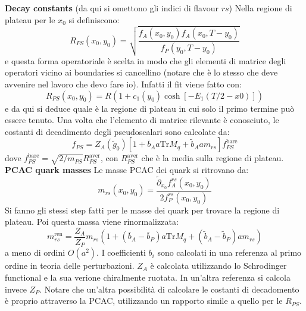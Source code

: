 \documentclass[12pt,a4paper,openright]{article}
\newcommand{\colg}{\textcolor{PineGreen}}
\newcommand{\colr}{\textcolor{BrickRed}}
\newcommand{\bare}{^{\text{bare}}}
\newcommand{\ren}{{\text{ren}}}
\begin{document}
{\bf Decay constants} \newline
(da qui si omettono gli indici di flavour $rs$) Nella regione di plateau per le $x_0$ si definiscono:
\begin{equation*}
  R_{PS}(x_0,y_0) = \sqrt{ \frac{f_A (x_0,y_0)f_A (x_0,T-y_0)}{f_P(y_0,T-y_0)} }
\end{equation*}
e questa forma operatoriale è scelta in modo che \colg{gli elementi di matrice degli operatori vicino ai boundaries si cancellino} (\colr{notare che è lo stesso che deve avvenire nel lavoro che devo fare io}).
Infatti il fit viene fatto con:
\begin{equation*}
  R_{PS}(x_0,y_0) = R(1 + c_1(y_0)\cosh[-E_1(T/2 - x0)])
\end{equation*}
e da qui si deduce quale è la regione di plateau in cui solo il primo termine può essere tenuto.
Una volta che l'elemento di matrice rilevante è conosciuto, le costanti di decadimento degli pseudoscalari sono calcolate da:
\begin{equation*}
  f_{PS} = Z_A (\tilde g_0)\left[1+ \bar b_A a\text{Tr}M_q + \tilde b_A am_{rs} \right]f_{PS}\bare
\end{equation*}
dove $f_{PS}\bare = \sqrt{2/m_{PS}} R_{PS}^{\text{aver}}$, con $R_{PS}^{\text{aver}}$ che è la media sulla regione di plateau.
\newline
\newline
{\bf PCAC quark masses} \newline
Le masse PCAC dei quark si ritrovano da:
\begin{equation*}
  m_{rs}(x_0,y_0) = \frac{\tilde{\partial}_{x_0}f_A^{rs} (x_0,y_0)}{2 f^{rs}_P (x_0,y_0)}
\end{equation*}
Si fanno gli stessi step fatti per le masse dei quark per trovare la regione di plateau.
Poi questa massa viene rinormalizzata:
\begin{equation*}
  m_{rs}^\ren = \frac{Z_A}{Z_P}m_{rs}\left(1 + ( \bar b_A - \bar b_P)a\text{Tr} M_q + ( \tilde b_A -  \tilde b_P)am_{rs}\right)
\end{equation*}
a meno di ordini $O(a^2)$. I coefficienti $b_i$ sono calcolati in una referenza al primo ordine in teoria delle perturbazioni.
$Z_A$ è calcolata utilizzando lo Schrodinger functional e la sua verione chiralmente ruotata.
In un'altra referenza si calcola invece $Z_P$.
\newline
Notare che un'altra possibilità di calcolare le costanti di decadomento è proprio attraverso la PCAC, utilizzando un rapporto simile a quello per le $R_{PS}$. 
\end{document}
